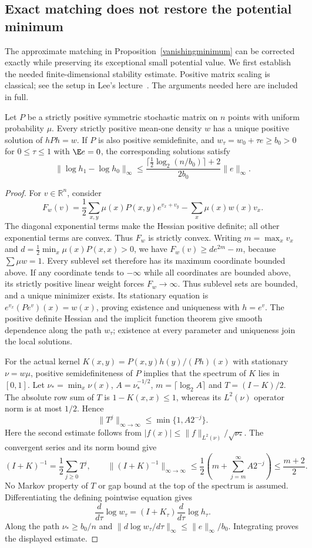 \subsection{Exact matching does not restore the potential minimum}
The approximate matching in Proposition~\ref{vanishingminimum} can be
corrected exactly while preserving its exceptional small potential value.
We first establish the needed finite-dimensional stability estimate.
Positive matrix scaling is classical; see the setup in Lee's
lecture~\cite{lee2016}. The arguments needed here are included in full.

\begin{lemma}\label{inversestationary}
Let $P$ be a strictly positive symmetric stochastic matrix on $n$ points
with uniform probability $\mu$. Every strictly positive mean-one density
$w$ has a unique positive solution of $hPh=w$. If $P$ is also positive
semidefinite, and $w_\tau=w_0+\tau e\geq b_0>0$ for $0\leq\tau\leq1$
with $\E e=0$, the corresponding solutions satisfy
\[
 \|\log h_1-\log h_0\|_\infty
 \leq\frac{\lceil\tfrac12\log_2(n/b_0)\rceil+2}{2b_0}
       \|e\|_\infty.
\]
\end{lemma}
\begin{proof}
For $v\in\mathbb R^n$, consider
\[
 F_w(v)=\frac12\sum_{x,y}\mu(x)P(x,y)e^{v_x+v_y}
              -\sum_x\mu(x)w(x)v_x.
\]
The diagonal exponential terms make the Hessian positive definite;
all other exponential terms are convex. Thus $F_w$ is strictly convex.
Writing $m=\max_x v_x$ and
$d=\tfrac12\min_x\mu(x)P(x,x)>0$, we have
$F_w(v)\geq de^{2m}-m$, because $\sum\mu w=1$.
Every sublevel set therefore has its maximum coordinate bounded above.
If any coordinate tends to $-\infty$ while all coordinates are bounded
above, its strictly positive linear weight forces $F_w\to\infty$.
Thus sublevel sets are bounded, and a unique minimizer exists. Its
stationary equation is $e^{v_x}(Pe^v)(x)=w(x)$, proving existence and
uniqueness with $h=e^v$. The positive definite Hessian and the implicit
function theorem give smooth dependence along the path $w_\tau$;
existence at every parameter and uniqueness join the local solutions.

For the actual kernel $K(x,y)=P(x,y)h(y)/(Ph)(x)$ with stationary
$\nu=w\mu$, positive semidefiniteness of $P$ implies that the spectrum
of $K$ lies in $[0,1]$. Let $\nu_* =\min_x\nu(x)$, $A=\nu_*^{-1/2}$,
$m=\lceil\log_2 A\rceil$ and $T=(I-K)/2$.
The absolute row sum of $T$ is $1-K(x,x)\leq1$, whereas its
$L^2(\nu)$ operator norm is at most $1/2$. Hence
\[
 \|T^j\|_{\infty\to\infty}\leq\min\{1,A2^{-j}\}.
\]
Here the second estimate follows from
$|f(x)|\leq\|f\|_{L^2(\nu)}/\sqrt{\nu_*}$.
The convergent series and its norm bound give
\[
 (I+K)^{-1}=\frac12\sum_{j\geq0}T^j,\qquad
 \|(I+K)^{-1}\|_{\infty\to\infty}
 \leq\frac12\left(m+\sum_{j=m}^{\infty}A2^{-j}\right)
 \leq\frac{m+2}{2}.
\]
No Markov property of $T$ or gap bound at the top of the spectrum is
assumed. Differentiating the defining pointwise equation gives
\[
 \frac{d}{d\tau}\log w_\tau
       =(I+K_\tau)\frac{d}{d\tau}\log h_\tau.
\]
Along the path $\nu_*\geq b_0/n$ and
$\|d\log w_\tau/d\tau\|_\infty\leq\|e\|_\infty/b_0$.
Integrating proves the displayed estimate.
\end{proof}

